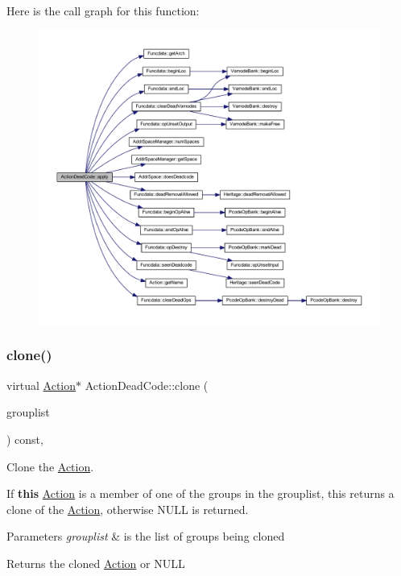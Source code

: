 Here is the call graph for this function\+:
\nopagebreak
\begin{figure}[H]
\begin{center}
\leavevmode
\includegraphics[width=350pt]{class_action_dead_code_a8fc0f3220ac7b0fef4613ba3666d9af9_cgraph}
\end{center}
\end{figure}
\mbox{\label{class_action_dead_code_a2c1a4dac2eab0a2a6979c073def75fc3}} 
\subsubsection{\texorpdfstring{clone()}{clone()}}
{\footnotesize\ttfamily virtual \mbox{\hyperlink{class_action}{Action}}$\ast$ Action\+Dead\+Code\+::clone (\begin{DoxyParamCaption}\item[{const \mbox{\hyperlink{class_action_group_list}{Action\+Group\+List}} \&}]{grouplist }\end{DoxyParamCaption}) const\hspace{0.3cm}{\ttfamily [inline]}, {\ttfamily [virtual]}}



Clone the \mbox{\hyperlink{class_action}{Action}}. 

If {\bfseries{this}} \mbox{\hyperlink{class_action}{Action}} is a member of one of the groups in the grouplist, this returns a clone of the \mbox{\hyperlink{class_action}{Action}}, otherwise N\+U\+LL is returned. 
\begin{DoxyParams}{Parameters}
{\em grouplist} & is the list of groups being cloned \\
\hline
\end{DoxyParams}
\begin{DoxyReturn}{Returns}
the cloned \mbox{\hyperlink{class_action}{Action}} or N\+U\+LL 
\end{DoxyReturn}


